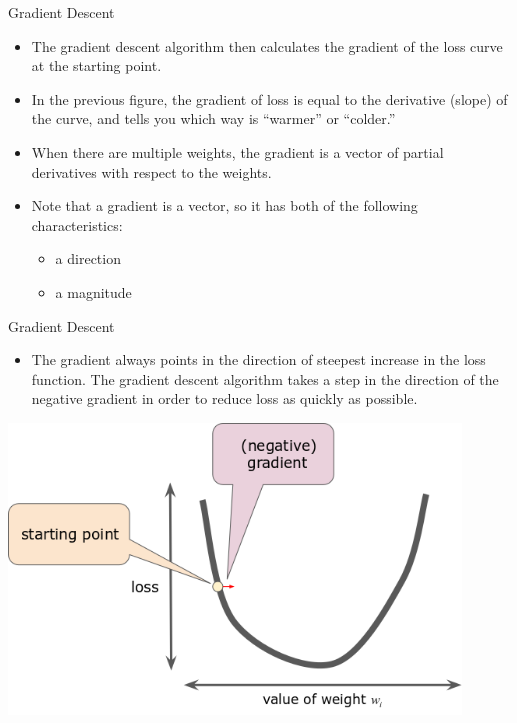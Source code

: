 \documentclass{beamer}
\begin{document}
\begin{frame}{Gradient Descent}
\begin{itemize}
    \item The gradient descent algorithm then calculates the gradient of the loss curve at the starting point. 
    
    \item In the previous figure, the gradient of loss is equal to the derivative (slope) of the curve, and tells you which way is ``warmer'' or ``colder.'' 
    
    \item When there are multiple weights, the gradient is a vector of partial derivatives with respect to the weights.
    
    \item Note that a gradient is a vector, so it has both of the following characteristics:
    \begin{itemize}
        \item a direction
        \item a magnitude
    \end{itemize}
\end{itemize}
\end{frame}

\begin{frame}{Gradient Descent}
\begin{itemize}
    \item The gradient always points in the direction of steepest increase in the loss function. The gradient descent algorithm takes a step in the direction of the negative gradient in order to reduce loss as quickly as possible.
\end{itemize}
\includegraphics[width=0.9\textwidth]{images/GradientDescentNegativeGradient.png}
\end{frame}
\end{document}
